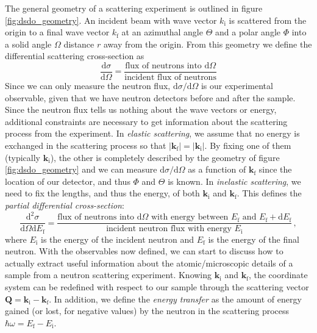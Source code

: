 The general geometry of a scattering experiment is outlined in figure \ref{fig:dsdo_geometry}. An incident beam with wave vector $k_\text{i}$ is scattered from the origin to a final wave vector $k_\text{f}$ at an azimuthal angle $\Theta$ and a polar angle $\Phi$ into a solid angle $\Omega$ distance $r$ away from the origin. From this geometry we define the differential scattering cross-section as
%
\[ \frac{\mathrm{d} \sigma}{\mathrm{d}\Omega} = \frac{\text{flux of neutrons into } \mathrm{d}\Omega}{\text{incident flux of neutrons}} \]
%
Since we can only measure the neutron flux, $\mathrm{d}\sigma / \mathrm{d}\Omega$ is our experimental observable, given that we have neutron detectors before and after the sample. Since the neutron flux tells us nothing about the wave vectors or energy, additional constraints are necessary to get information about the scattering process from the experiment. In \emph{elastic scattering}, we assume that no energy is exchanged in the scattering process so that $|\bm{k}_\text{f}| = |\bm{k}_\text{i}|$. By fixing one of them (typically $\bm{k}_\text{i}$), the other is completely described by the geometry of figure \ref{fig:dsdo_geometry} and we can measure $\mathrm{d}\sigma / \mathrm{d}\Omega$ as a function of $\bm{k}_\text{f}$ since the location of our detector, and thus $\Phi$ and $\Theta$ is known. In \emph{inelastic scattering}, we need to fix the lengths, and thus the energy, of both $\bm{k}_\text{i}$ and $\bm{k}_\text{f}$. This defines the \emph{partial differential cross-section}:
%
\[ \frac{\mathrm{d}^2 \sigma}{\mathrm{d}\Omega \mathrm{d}E_\text{f}} = \frac{\text{flux of neutrons into } \mathrm{d}\Omega \text{ with energy between } E_\text{f} \text{ and } E_\text{f} + \mathrm{d}E_\text{f}}{\text{incident neutron flux with energy } E_\text{i}} \, , \]
%
where $E_\text{i}$ is the energy of the incident neutron and $E_\text{f}$ is the energy of the final neutron. With the observables now defined, we can start to discuss how to actually extract useful information about the atomic/microscopic details of a sample from a neutron scattering experiment. Knowing $\bm{k}_\text{i}$ and $\bm{k}_\text{f}$, the coordinate system can be redefined with respect to our sample through the scattering vector $\bm{Q} = \bm{k}_\text{i} - \bm{k}_\text{f}$. In addition, we define the \emph{energy transfer} as the amount of energy gained (or lost, for negative values) by the neutron in the scattering process $\hbar \omega = E_\text{f} - E_\text{i}$.

